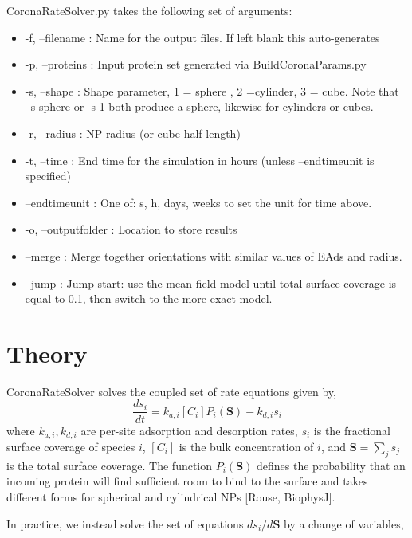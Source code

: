 \documentclass[10pt,a4paper,onecolumn]{report}
\begin{document}
CoronaRateSolver.py takes the following set of arguments:
\begin{itemize}
\item -f, --filename : Name for the output files. If left blank this auto-generates
\item -p, --proteins : Input protein set generated via BuildCoronaParams.py
\item -s, --shape    : Shape parameter, 1 = sphere , 2 =cylinder, 3 = cube. Note that --s sphere or -s 1 both produce a sphere, likewise for cylinders or cubes.
\item -r, --radius   : NP radius (or cube half-length)
\item -t, --time     : End time for the simulation in hours (unless --endtimeunit is specified)
\item --endtimeunit  : One of:  s, h, days, weeks to set the unit for time above.
\item -o, --outputfolder : Location to store results
\item --merge : Merge together orientations with similar values of EAds and radius. 
\item --jump : Jump-start: use the mean field model until total surface coverage is equal to 0.1, then switch to the more exact model.
\end{itemize}

\section{Theory}
CoronaRateSolver  solves the coupled set of rate equations given by,
\begin{equation}
\frac{ d s_i}{dt} = k_{a,i} [C_i] P_i(\mathbf{S}) - k_{d,i} s_i
\end{equation}
where $k_{a,i}, k_{d,i}$ are per-site adsorption and desorption rates, $s_i$ is the fractional surface coverage of species $i$, $[C_i]$ is the bulk concentration of $i$,  and $\mathbf{S} = \sum_j s_j$ is the total surface coverage. The function $P_i(\mathbf{S})$ defines the probability that an incoming protein will find sufficient room to bind to the surface and takes different forms for spherical and cylindrical NPs [Rouse, BiophysJ].

In practice, we instead solve the set of equations $d s_i / d \mathbf{S}$ by a change of variables,
\end{document}
